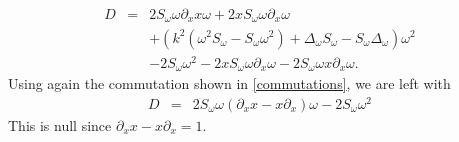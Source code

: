 \documentclass[a4paper]{article}
\begin{document}
\begin{eqnarray*}
	D &=& 2 S_\omega \omega \partial_x x\omega + 2 x S_\omega  \omega \partial_x \omega \\
	&& + \left(k^2(\omega^2 S_\omega - S_\omega \omega^2) + \Delta_\omega S_\omega - S_\omega \Delta_\omega \right)\omega^2\\
	&& - 2 S_\omega \omega^2 - 2 x  S_\omega \omega \partial_x \omega - 2 S_\omega \omega x \partial_x \omega.
\end{eqnarray*}
Using again the commutation shown in \autoref{commutations}, we are left with 
\begin{eqnarray*}
	D &=&  2 S_\omega \omega (\partial_x x - x \partial_x) \omega - 2 S_\omega \omega^2
\end{eqnarray*}
This is null since $\partial_x x - x \partial_x = 1$. 

	
	
	
	
	
	
	
	
\end{document}

